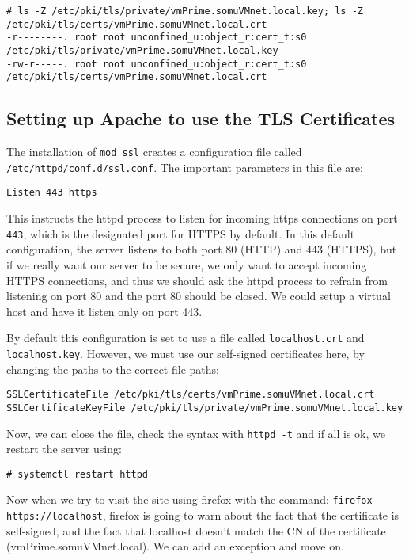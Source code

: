 \vspace{-15pt}
\begin{verbatim}
# ls -Z /etc/pki/tls/private/vmPrime.somuVMnet.local.key; ls -Z /etc/pki/tls/certs/vmPrime.somuVMnet.local.crt 
-r--------. root root unconfined_u:object_r:cert_t:s0  /etc/pki/tls/private/vmPrime.somuVMnet.local.key
-rw-r-----. root root unconfined_u:object_r:cert_t:s0  /etc/pki/tls/certs/vmPrime.somuVMnet.local.crt
\end{verbatim}
\vspace{-10pt}	

\subsection{Setting up Apache to use the TLS Certificates}
The installation of \verb|mod_ssl| creates a configuration file called \verb|/etc/httpd/conf.d/ssl.conf|. The important parameters in this file are:

\vspace{-15pt}
\begin{verbatim}
Listen 443 https
\end{verbatim}
\vspace{-10pt}	

\noindent
This instructs the httpd process to listen for incoming https connections on port \verb|443|, which is the designated port for HTTPS by default. In this default configuration, the server listens to both port 80 (HTTP) and 443 (HTTPS), but if we really want our server to be secure, we only want to accept incoming HTTPS connections, and thus we should ask the httpd process to refrain from listening on port 80 and the port 80 should be closed. We could setup a virtual host and have it listen only on port 443. 

By default this configuration is set to use a file called \verb|localhost.crt| and \verb|localhost.key|. However, we must use our self-signed certificates here, by changing the paths to the correct file paths:

\vspace{-15pt}
\begin{verbatim}
SSLCertificateFile /etc/pki/tls/certs/vmPrime.somuVMnet.local.crt
SSLCertificateKeyFile /etc/pki/tls/private/vmPrime.somuVMnet.local.key
\end{verbatim}
\vspace{-10pt}	

\noindent
Now, we can close the file, check the syntax with \verb|httpd -t| and if all is ok, we restart the server using:

\vspace{-15pt}
\begin{verbatim}
# systemctl restart httpd
\end{verbatim}
\vspace{-10pt}	

\noindent
Now when we try to visit the site using firefox with the command: \verb|firefox https://localhost|, firefox is going to warn about the fact that the certificate is self-signed, and the fact that localhost doesn't match the CN of the certificate (vmPrime.somuVMnet.local). We can add an exception and move on. 